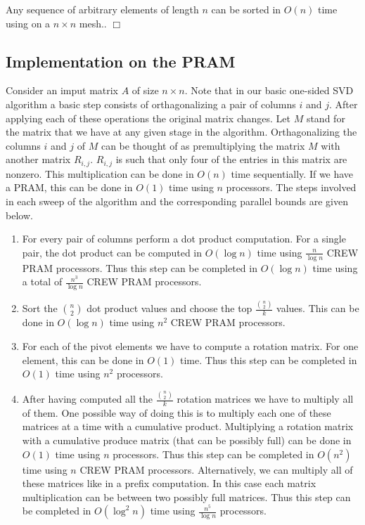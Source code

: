 \begin{lemma}
\label{sort2}
Any  sequence of arbitrary elements of length $n$ can be sorted in
$O( n)$ time using on a $n\times n$ mesh..
\hfill $\Box$
\end{lemma}

\subsection{Implementation on the PRAM}
Consider an imput matrix $A$ of size $n\times n$. Note that in our basic one-sided SVD algorithm a basic step consists of orthagonalizing a pair of columns $i$ and $j$. After applying each of these operations the original matrix changes. Let $M$ stand for the matrix that we have at any given stage in the algorithm. Orthagonalizing the columns $i$ and $j$ of $M$ can be thought of as premultiplying the matrix $M$ with another matrix $R_{i,j}$. $R_{i,j}$ is such that only four of the entries in this matrix are nonzero. This multiplication can be done in $O(n)$ time sequentially. If we have a PRAM, this can be done in $O(1)$ time using $n$ processors. The steps involved in each sweep of the algorithm and the corresponding parallel bounds are given below.
\begin{enumerate}
\item For every pair of columns perform a dot product computation. For a single pair, the dot product can be computed in $O(\log n)$ time using $\frac{n}{\log n}$ CREW PRAM processors. Thus this step can be completed in $O(\log n)$ time using a total of $\frac{n^3}{\log n}$ CREW PRAM processors.
\item Sort the ${n}\choose{2}$ dot product values and choose the top $\frac{{n\choose 2}}{k}$ values. This can be done in $O(\log n)$ time using $n^2$ CREW PRAM processors.
\item For each of the pivot elements we have to compute a rotation matrix. For one element, this can be done in $O(1)$ time. Thus this step can be completed in $O(1)$ time using $n^2$ processors.
\item After having computed all the $\frac{{n\choose 2}}{k}$ rotation matrices we have to multiply all of them. One possible way of doing this is to multiply each one of these matrices at a time with a cumulative product. Multiplying a rotation matrix with a cumulative produce matrix (that can be possibly full) can be done in $O(1)$ time using $n$ processors. Thus this step can be completed in $O(n^2)$ time using $n$ CREW PRAM processors. Alternatively, we can multiply all of these matrices like in a prefix computation. In this case each matrix multiplication can be between two possibly full matrices. Thus this step can be completed in $O(\log^2n)$ time using $\frac{n^5}{\log n}$ processors.
\end{enumerate}

